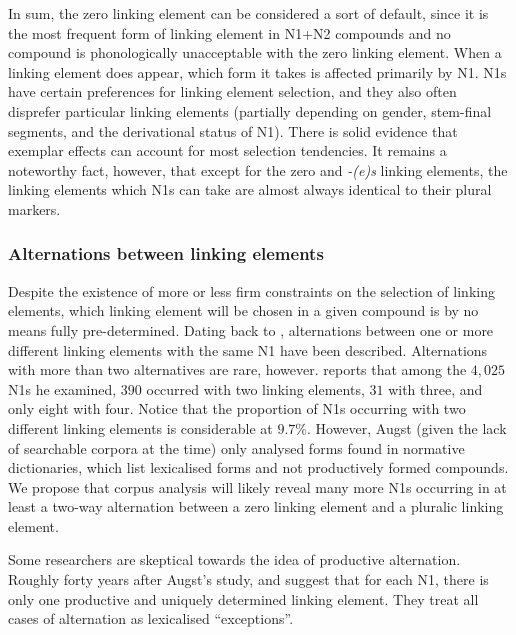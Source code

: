 In sum, the zero linking element can be considered a sort of default, since it is the most frequent form of linking element in N1+N2 compounds and no compound is phonologically unacceptable with the zero linking element.
When a linking element does appear, which form it takes is affected primarily by N1.
N1s have certain preferences for linking element selection, and they also often disprefer particular linking elements (partially depending on gender, stem-final segments, and the derivational status of N1).
There is solid evidence that exemplar effects can account for most selection tendencies.
It remains a noteworthy fact, however, that except for the zero and \textit{-(e)s} linking elements, the linking elements which N1s can take are almost always identical to their plural markers.

\subsubsection{Alternations between linking elements}

Despite the existence of more or less firm constraints on the selection of linking elements, which linking element will be chosen in a given compound is by no means fully pre-determined.
Dating back to \citet{Augst1975}, alternations between one or more different linking elements with the same N1 have been described.
Alternations with more than two alternatives are rare, however.
\citet[134--135]{Augst1975} reports that among the $4,025$ N1s he examined, $390$ occurred with two linking elements, $31$ with three, and only eight with four.
Notice that the proportion of N1s occurring with two different linking elements is considerable at $9.7\%$.
However, Augst (given the lack of searchable corpora at the time) only analysed forms found in normative dictionaries, which list lexicalised forms and not productively formed compounds.
We propose that corpus analysis will likely reveal many more N1s occurring in at least a two-way alternation between a zero linking element and a pluralic linking element.

Some researchers are skeptical towards the idea of productive alternation.
Roughly forty years after Augst's study, \citet[31]{NeefBorgwaldt2012} and \citet[46]{Neef2015} suggest that for each N1, there is only one productive and uniquely determined linking element.
They treat all cases of alternation as lexicalised ``exceptions''.

